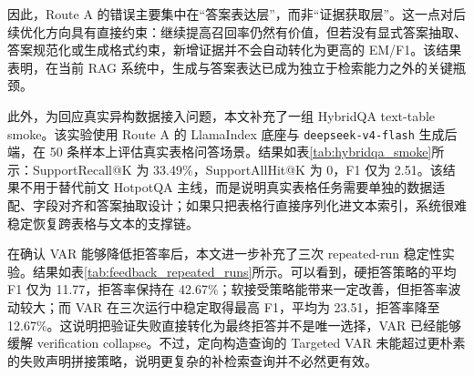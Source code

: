 因此，Route A 的错误主要集中在“答案表达层”，而非“证据获取层”。这一点对后续优化方向具有直接约束：继续提高召回率仍然有价值，但若没有显式答案抽取、答案规范化或生成格式约束，新增证据并不会自动转化为更高的 EM/F1。该结果表明，在当前 RAG 系统中，生成与答案表达已成为独立于检索能力之外的关键瓶颈。

此外，为回应真实异构数据接入问题，本文补充了一组 HybridQA text-table smoke。该实验使用 Route A 的 LlamaIndex 底座与 \texttt{deepseek-v4-flash} 生成后端，在 50 条样本上评估真实表格问答场景。结果如表\ref{tab:hybridqa_smoke}所示：SupportRecall@K 为 33.49\%，SupportAllHit@K 为 0，F1 仅为 2.51。该结果不用于替代前文 HotpotQA 主线，而是说明真实表格任务需要单独的数据适配、字段对齐和答案抽取设计；如果只把表格行直接序列化进文本索引，系统很难稳定恢复跨表格与文本的支撑链。

\begin{table}[!htbp]
\centering
\caption{真实 text-table 异构任务 smoke（HybridQA, N=50）}
\label{tab:hybridqa_smoke}
\end{table}

在确认 VAR 能够降低拒答率后，本文进一步补充了三次 repeated-run 稳定性实验。结果如表\ref{tab:feedback_repeated_runs}所示。可以看到，硬拒答策略的平均 F1 仅为 11.77，拒答率保持在 42.67\%；软接受策略能带来一定改善，但拒答率波动较大；而 VAR 在三次运行中稳定取得最高 F1，平均为 23.51，拒答率降至 12.67\%。这说明把验证失败直接转化为最终拒答并不是唯一选择，VAR 已经能够缓解 verification collapse。不过，定向构造查询的 Targeted VAR 未能超过更朴素的失败声明拼接策略，说明更复杂的补检索查询并不必然更有效。

\begin{table}[!htbp]
\centering
\caption{真实 CoVe 条件下 VAR 的 repeated-run 稳定性（HotpotQA, N=50, 3 runs）}
\label{tab:feedback_repeated_runs}
\end{table}

